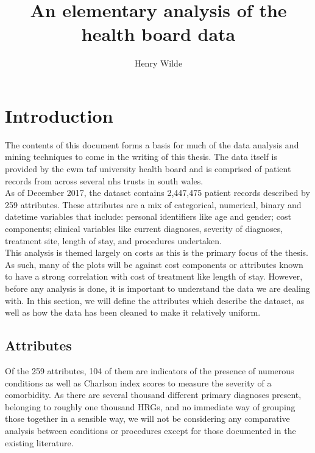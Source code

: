 \documentclass{article}
\title{An elementary analysis of the health board data}
\author{Henry Wilde}
\begin{document}
\maketitle




\section{Introduction}\label{section:intro}

The contents of this document forms a basis for much of the data analysis and
mining techniques to come in the writing of this thesis. The data itself is
provided by the cwm taf university health board and is comprised of patient
records from across several nhs trusts in south wales. \\

As of December 2017, the dataset contains 2,447,475 patient records described by
259 attributes. These attributes are a mix of categorical, numerical, binary and
datetime variables that include: personal identifiers like age and gender; cost
components; clinical variables like current diagnoses, severity of diagnoses,
treatment site, length of stay, and procedures undertaken. \\

This analysis is themed largely on costs as this is the primary focus of the
thesis. As such, many of the plots will be against cost components or attributes
known to have a strong correlation with cost of treatment like length of stay.
However, before any analysis is done, it is important to understand the data we
are dealing with. In this section, we will define the attributes which describe
the dataset, as well as how the data has been cleaned to make it relatively
uniform. 


\subsection{Attributes}\label{subsection:attributes}

Of the 259 attributes, 104 of them are indicators of the presence of numerous
conditions as well as Charlson index scores to measure the severity of a
comorbidity. As there are several thousand different primary diagnoses present, 
belonging to roughly one thousand HRGs, and no immediate way of grouping those
together in a sensible way, we will not be considering any comparative analysis
between conditions or procedures except for those documented in the existing
literature. \\
\end{document}

